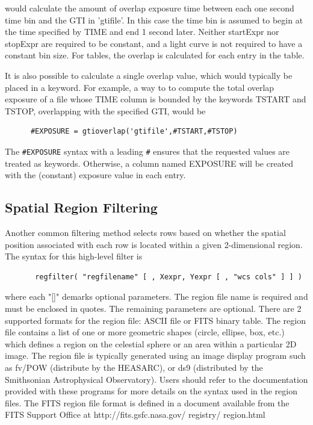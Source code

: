 \documentclass[11pt]{book}
\begin{document}
    would calculate the amount of overlap exposure time between each
    one second time bin and the GTI in 'gtifile'.  In this case the
    time bin is assumed to begin at the time specified by TIME and end
    1 second later.  Neither startExpr nor stopExpr are required to be
    constant, and a light curve is not required to have a constant bin
    size.  For tables, the overlap is calculated for each entry in the
    table.

    It is also possible to calculate a single overlap value, which
    would typically be placed in a keyword.  For example, a way to to
    compute the total overlap exposure of a file whose TIME column is
    bounded by the keywords TSTART and TSTOP, overlapping with the
    specified GTI, would be

\begin{verbatim}
      #EXPOSURE = gtioverlap('gtifile',#TSTART,#TSTOP)
\end{verbatim}

    The \verb+#EXPOSURE+ syntax with a leading \verb+#+ ensures that the
    requested values are treated as keywords.  Otherwise, a column
    named EXPOSURE will be created with the (constant) exposure value
    in each entry.  


\subsection{Spatial Region Filtering}

    Another common  filtering method selects rows based on whether the
    spatial position associated with each row is located within a given
    2-dimensional region.  The syntax for this high-level filter is

\begin{verbatim}
       regfilter( "regfilename" [ , Xexpr, Yexpr [ , "wcs cols" ] ] )
\end{verbatim}
    where each "[]" demarks optional parameters. The region file name
    is required and must be  enclosed in quotes.  The remaining
    parameters are optional.  There are 2 supported formats for the
    region file: ASCII file or FITS binary table.  The region file
    contains a list of one or more geometric shapes (circle,
    ellipse, box, etc.) which defines a region on the celestial sphere
    or an area within a particular 2D image.  The region file is
    typically generated using an image display program such as fv/POW
    (distribute by the HEASARC), or ds9 (distributed by the Smithsonian
    Astrophysical Observatory).  Users should refer to the documentation
    provided with these programs for more details on the syntax used in
    the region files.  The FITS region file format is defined in a document
    available from the FITS Support Office at
    http://fits.gsfc.nasa.gov/ registry/ region.html
\end{document}
